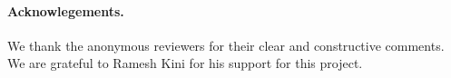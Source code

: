 \documentclass[10pt]{llncs}
\begin{document}
\paragraph{Acknowlegements.} We thank the anonymous reviewers for their clear and constructive comments. We are grateful to Ramesh Kini for his support for this project.


%
\label{sect:bib}

%
%
%


\appendix




\end{document}
